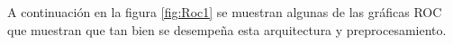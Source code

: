 \par A continuación en la figura \ref{fig:Roc1} se muestran algunas de las gráficas ROC que muestran que tan bien se desempeña esta arquitectura y preprocesamiento.
\begin{figure}

	\begin{table}[H]
		\centering
\end{table}
\end{figure}

